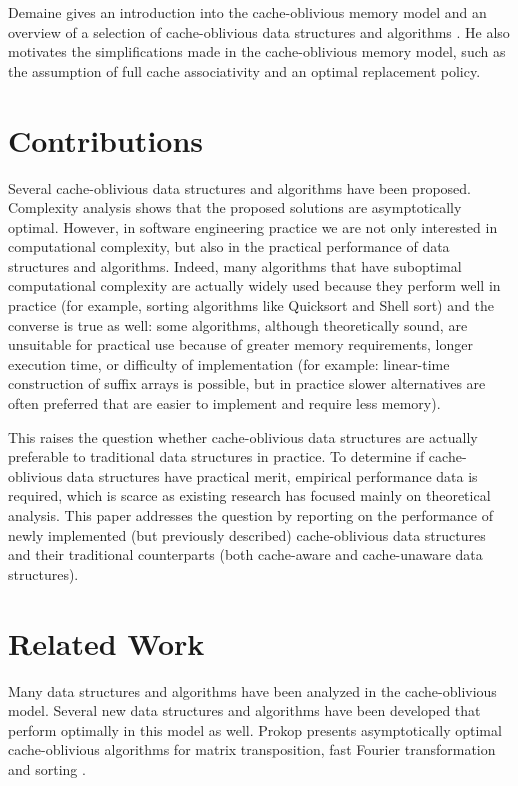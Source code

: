 \documentclass{acm_proc_article-sp}
\begin{document}
Demaine gives an introduction into the cache-oblivious memory model and an overview of a selection of cache-oblivious data structures and algorithms \cite{demaine2002coa}. He also motivates the simplifications made in the cache-oblivious memory model, such as the assumption of full cache associativity and an optimal replacement policy.

\section{Contributions}
Several cache-oblivious data structures and algorithms have been proposed. Complexity analysis shows that the proposed solutions are asymptotically optimal. However, in software engineering practice we are not only interested in computational complexity, but also in the practical performance of data structures and algorithms. Indeed, many algorithms that have suboptimal computational complexity are actually widely used because they perform well in practice (for example, sorting algorithms like Quicksort and Shell sort) and the converse is true as well: some algorithms, although theoretically sound, are unsuitable for practical use because of greater memory requirements, longer execution time, or difficulty of implementation (for example: linear-time construction of suffix arrays is possible, but in practice slower alternatives are often preferred that are easier to implement and require less memory).

This raises the question whether cache-oblivious data structures are actually preferable to traditional data structures in practice. To determine if cache-oblivious data structures have practical merit, empirical performance data is required, which is scarce as existing research has focused mainly on theoretical analysis. This paper addresses the question by reporting on the performance of newly implemented (but previously described) cache-oblivious data structures and their traditional counterparts (both cache-aware and cache-unaware data structures).

\section{Related Work}
\label{sect-related-work}
Many data structures and algorithms have been analyzed in the cache-oblivious model. Several new data structures and algorithms have been developed that perform optimally in this mo\-del as well. Prokop presents asymptotically optimal cache-oblivious algorithms for matrix transposition, fast Fourier transformation and sorting \cite{prokop1999coa}.
\end{document}
